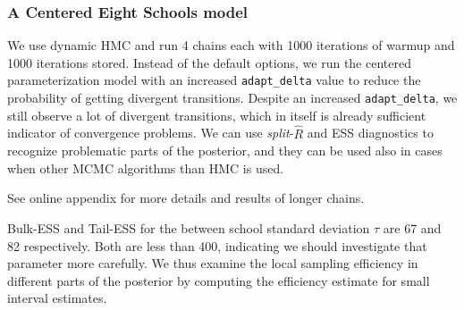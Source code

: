\documentclass[american,]{article}
\begin{document}
\hypertarget{a-centered-eight-schools-model}{%
\subsubsection{A Centered Eight Schools
model}\label{a-centered-eight-schools-model}}

We use dynamic HMC and run 4 chains each with 1000 iterations of
warmup and 1000 iterations stored. Instead of the default options, we
run the centered parameterization model with an increased
\texttt{adapt\_delta} value to reduce the probability of getting
divergent transitions. Despite an increased \texttt{adapt\_delta}, we
still observe a lot of divergent transitions, which in itself is
already sufficient indicator of convergence problems. We can use
\emph{split}-\(\widehat{R}\) and ESS diagnostics to recognize
problematic parts of the posterior, and they can be used also in cases
when other MCMC algorithms than HMC is used.




See online appendix for more details and results of longer chains.

Bulk-ESS and Tail-ESS for the between school standard deviation $\tau$
are 67 and 82 respectively. Both are less than 400, indicating we
should investigate that parameter more carefully. We thus examine the
local sampling efficiency in different parts of the posterior by
computing the efficiency estimate for small interval estimates.
\end{document}
